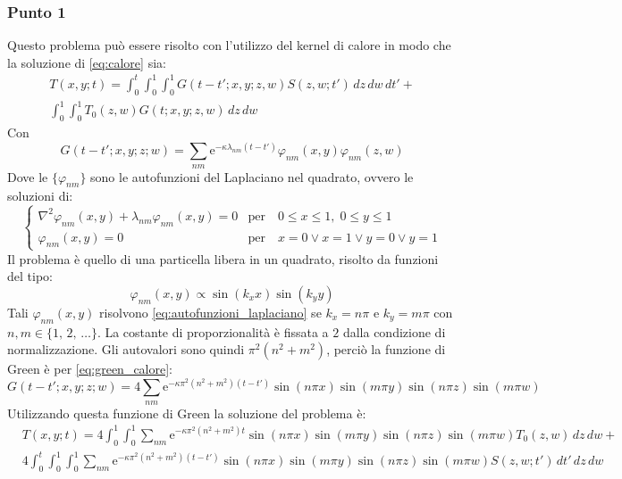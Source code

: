 \documentclass[]{scrartcl}
\newcommand{\lap}{\nabla^2}
\begin{document}
\subsubsection*{Punto 1}
Questo problema può essere risolto con l'utilizzo del kernel di calore in modo che la soluzione di \eqref{eq:calore} sia:  
\begin{multline}
T(x,y;t) = \int_0^t \int_0^1 \int_0^1 G(t-t';x,y;z,w) S(z,w;t')\,dz\,dw\,dt' + \\ \int_0^1 \int_0^1 T_0(z,w) G(t;x,y;z,w)\,dz\,dw
\label{eq:sol_general_calore}
\end{multline}
Con 
\begin{equation}
G(t-t';x,y;z;w) = \sum_{nm} \mathrm{e}^{-\kappa \lambda_{nm} (t-t')} \varphi_{nm}(x,y) \varphi_{nm}(z,w)
\label{eq:green_calore}
\end{equation}
Dove le $ \{\varphi_{nm}\} $ sono le autofunzioni del Laplaciano nel quadrato, ovvero le soluzioni di: 
  \begin{equation}
  	\begin{cases}
  	\lap \varphi_{nm}(x,y) + \lambda_{nm}\varphi_{nm}(x,y) = 0 & \text{per} \quad 0\leq x \leq 1,\; 0\leq y \leq 1  \\
  	\varphi_{nm}(x,y) = 0 & \text{per} \quad x = 0 \vee x = 1 \vee y = 0 \vee y = 1 \label{eq:autofunzioni_laplaciano}
  	\end{cases}{}
  \end{equation}
Il problema è quello di una particella libera in un quadrato, risolto da funzioni del tipo:
\[	\varphi_{nm}(x,y) \propto \sin\left(k_x x\right)\sin\left(k_y y\right)	\]
Tali $ \varphi_{nm}(x,y) $ risolvono \eqref{eq:autofunzioni_laplaciano} se $ k_x = n\pi $ e $ k_y = m\pi $ con $ n,m \in \{1,\,2,\,\dots\} $. La costante di proporzionalità è fissata a $ 2 $ dalla condizione di normalizzazione. Gli autovalori sono quindi $ \pi^2(n^2+m^2) $, perciò la funzione di Green è per \eqref{eq:green_calore}:
\[	G(t-t';x,y;z;w) = 4 \sum_{nm} \mathrm{e}^{-\kappa \pi^2(n^2 + m^2) (t-t')} \sin(n\pi x) \sin(m \pi y) \sin(n\pi z) \sin(m \pi w)	\]
Utilizzando questa funzione di Green la soluzione del problema è:
\begin{equation}
\begin{split}
& T(x,y;t) = 4 \int_0^1 \int_0^1 \sum_{nm} \mathrm{e}^{-\kappa \pi^2(n^2 + m^2) t} \sin(n\pi x) \sin(m \pi y) \sin(n\pi z) \sin(m \pi w) T_0(z,w)\,dz\,dw +\\
& 4 \int_0^t \int_0^1 \int_0^1 \sum_{nm} \mathrm{e}^{-\kappa \pi^2(n^2 + m^2) (t-t')} \sin(n\pi x) \sin(m \pi y) \sin(n\pi z) \sin(m \pi w) S(z,w;t')\,dt'\,dz\,dw 
\label{eq:seconda_parte_calore}
\end{split}
\end{equation}
\end{document}
